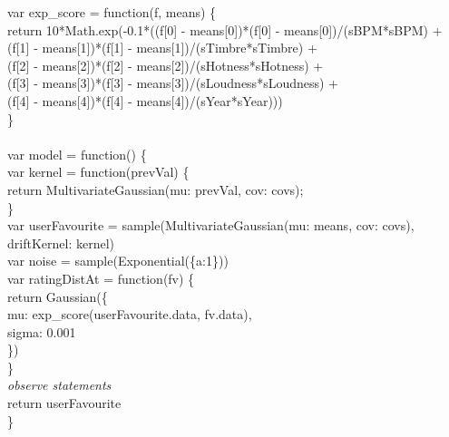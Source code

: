 \documentclass{amsart}
\theoremstyle{plain}
\theoremstyle{definition}
\begin{document}
   	\noindent var exp\_score = function(f, means) \{ \\
   	\indent	return 10*Math.exp(-0.1*((f[0] - means[0])*(f[0] - means[0])/(sBPM*sBPM) + \\
   		\indent\indent(f[1] - means[1])*(f[1] - means[1])/(sTimbre*sTimbre) + \\
   		\indent\indent(f[2] - means[2])*(f[2] - means[2])/(sHotness*sHotness) + \\
   		\indent\indent(f[3] - means[3])*(f[3] - means[3])/(sLoudness*sLoudness) + \\
   		\indent\indent(f[4] - means[4])*(f[4] - means[4])/(sYear*sYear)))\\
   	\}\\
   	\\
   	var model = function() \{ \\
   	\indent var kernel = function(prevVal) \{ \\
   	\indent	\indent	return MultivariateGaussian({mu: prevVal, cov: covs}); \\
   		\indent \} \\
   		\indent var userFavourite = sample(MultivariateGaussian({mu: means, cov: covs}), {driftKernel: kernel}) \\
   		\indent var noise = sample(Exponential(\{a:1\})) \\
   		\indent var ratingDistAt = function(fv) \{ \\
   			\indent\indent return Gaussian(\{      \\
   				\indent\indent\indent mu: exp\_score(userFavourite.data, fv.data), \\
   				\indent\indent\indent sigma: 0.001 \\
   			\indent\indent \}) \\
   			\indent \} \\	
   		\indent\textit{observe statements}	\\
   		\indent return userFavourite \\
   		\} 
   		
   
\end{document}
